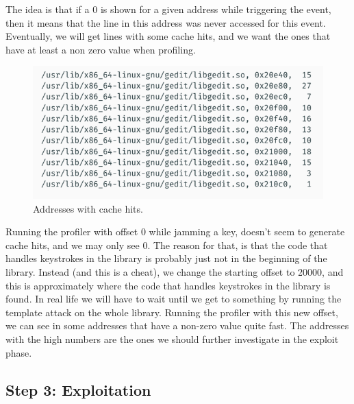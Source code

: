 The idea is that if a 0 is shown for a given address while triggering the event,
then it means that the line in this address was never accessed for this event.
Eventually, we will get lines with some cache hits, and we want the ones
that have at least a non zero value when profiling.

\begin{figure}[!ht]
    \centering
    \includegraphics[width=\textwidth]{images/chapter_6/profiling-cache-hits.png}
    \caption{Addresses with cache hits.}
    \label{fig:profiling-cache-hits}
\end{figure}

Running the profiler with offset 0 while jamming a key, doesn't seem to generate
cache hits, and we may only see 0. The reason for that, is that the code that
handles keystrokes in the library is probably just not in the beginning of the
library. Instead (and this is a cheat), we change the starting offset to 20000,
and this is approximately where the code that handles keystrokes in the library
is found. In real life we will have to wait until we get to something by running
the template attack on the whole library. Running the profiler with this new
offset, we can see in  some addresses that have a
non-zero value quite fast. The addresses with the high numbers are the ones we
should further investigate in the exploit phase.

\subsection{Step 3: Exploitation}
\label{subsec:step3exploitation}


